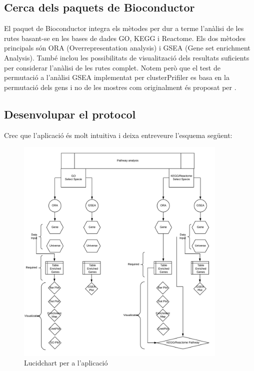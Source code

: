 \documentclass[]{article}
\begin{document}
\subsection{Cerca dels paquets de Bioconductor}

El paquet  de Bioconductor integra els mètodes per dur a terme l'anàlisi de les rutes basant-se en les bases de dades GO, KEGG i Reactome. Els dos mètodes principals són ORA (Overrepresentation analysis) i GSEA (Gene set enrichment Analysis). També inclou les possibilitats de visualització dels resultats suficients per considerar l'anàlisi de les rutes complet. Notem però que el test de permutació a l'anàlisi GSEA implementat per clusterPrifiler es basa en la permutació dels gens i no de les mostres com originalment és proposat per \cite{subramanian2005gene}.

\subsection{Desenvolupar el protocol}

Crec que l'aplicació és molt intuitiva i deixa entreveure l'esquema següent:

\begin{figure}[H]
\centering
\includegraphics[width=0.9\textwidth]{LucidChart.png} 
\caption{Lucidchart per a l'aplicació}
\end{figure}
\end{document}
